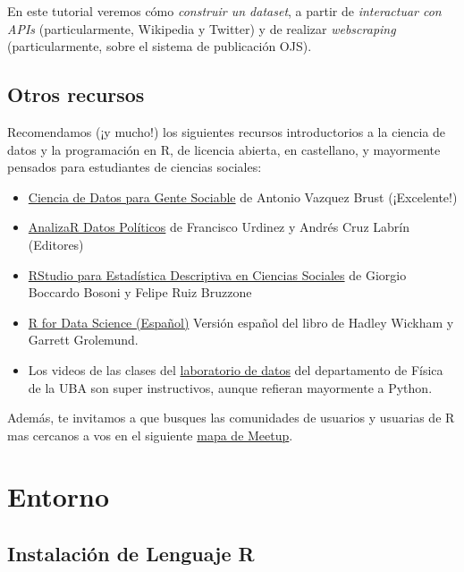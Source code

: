 \documentclass[
]{book}
\providecommand{\tightlist}{%
  \setlength{\itemsep}{0pt}\setlength{\parskip}{0pt}}
\begin{document}
En este tutorial veremos cómo \emph{construir un dataset}, a partir de \emph{interactuar con APIs} (particularmente, Wikipedia y Twitter) y de realizar \emph{webscraping} (particularmente, sobre el sistema de publicación OJS).

\hypertarget{otros-recursos}{%
\section*{Otros recursos}\label{otros-recursos}}

Recomendamos (¡y mucho!) los siguientes recursos introductorios a la ciencia de datos y la programación en R, de licencia abierta, en castellano, y mayormente pensados para estudiantes de ciencias sociales:

\begin{itemize}
\tightlist
\item
  \href{https://bitsandbricks.github.io/ciencia_de_datos_gente_sociable/}{Ciencia de Datos para Gente Sociable} de Antonio Vazquez Brust (¡Excelente!)
\item
  \href{https://arcruz0.github.io/libroadp/index.html}{AnalizaR Datos Políticos} de Francisco Urdinez y Andrés Cruz Labrín (Editores)
\item
  \href{https://bookdown.org/gboccardo/manual-ED-UCH/}{RStudio para Estadística Descriptiva en Ciencias Sociales} de Giorgio Boccardo Bosoni y Felipe Ruiz Bruzzone
\item
  \href{https://es.r4ds.hadley.nz/}{R for Data Science (Español)} Versión español del libro de Hadley Wickham y Garrett Grolemund.
\item
  Los videos de las clases del \href{http://materias.df.uba.ar/lda2021c1/171-2/}{laboratorio de datos} del departamento de Física de la UBA son super instructivos, aunque refieran mayormente a Python.
\end{itemize}

Además, te invitamos a que busques las comunidades de usuarios y usuarias de R mas cercanos a vos en el siguiente \href{https://www.meetup.com/es/pro/r-user-groups/}{mapa de Meetup}.

\hypertarget{entorno}{%
\chapter*{Entorno}\label{entorno}}

\hypertarget{instalaciuxf3n-de-lenguaje-r}{%
\section*{Instalación de Lenguaje R}\label{instalaciuxf3n-de-lenguaje-r}}
\end{document}
